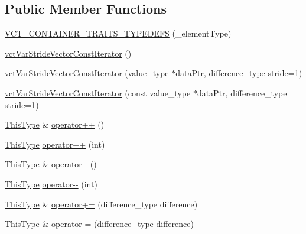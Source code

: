 \subsection*{Public Member Functions}
\begin{DoxyCompactItemize}
\item 
\hyperlink{classvct_var_stride_vector_const_iterator_a54d5bb180f198cc55568194d1ce4129c}{V\+C\+T\+\_\+\+C\+O\+N\+T\+A\+I\+N\+E\+R\+\_\+\+T\+R\+A\+I\+T\+S\+\_\+\+T\+Y\+P\+E\+D\+E\+F\+S} (\+\_\+element\+Type)
\item 
\hyperlink{classvct_var_stride_vector_const_iterator_af97b14def571ce0ee2b489d93a28e7b0}{vct\+Var\+Stride\+Vector\+Const\+Iterator} ()
\item 
\hyperlink{classvct_var_stride_vector_const_iterator_ae00e63fb9e2deae7fa6d949c4bec7652}{vct\+Var\+Stride\+Vector\+Const\+Iterator} (value\+\_\+type $\ast$data\+Ptr, difference\+\_\+type stride=1)
\item 
\hyperlink{classvct_var_stride_vector_const_iterator_a7f1e8affa1a308a17782d6609c95f02b}{vct\+Var\+Stride\+Vector\+Const\+Iterator} (const value\+\_\+type $\ast$data\+Ptr, difference\+\_\+type stride=1)
\item 
\hyperlink{classvct_var_stride_vector_const_iterator_afd99aad7dc756d227f4fb02cd569d00a}{This\+Type} \& \hyperlink{classvct_var_stride_vector_const_iterator_a8ebd4995ba7fe0b7f319a7a0f1cd52a0}{operator++} ()
\item 
\hyperlink{classvct_var_stride_vector_const_iterator_afd99aad7dc756d227f4fb02cd569d00a}{This\+Type} \hyperlink{classvct_var_stride_vector_const_iterator_a12591d59f1ef9294d4b52fdbca1de5fd}{operator++} (int)
\item 
\hyperlink{classvct_var_stride_vector_const_iterator_afd99aad7dc756d227f4fb02cd569d00a}{This\+Type} \& \hyperlink{classvct_var_stride_vector_const_iterator_a2fb864101547b86795e3468a2578d323}{operator-\/-\/} ()
\item 
\hyperlink{classvct_var_stride_vector_const_iterator_afd99aad7dc756d227f4fb02cd569d00a}{This\+Type} \hyperlink{classvct_var_stride_vector_const_iterator_a7d2d1fb4dda7dbff1aaa7b5e8f3ee4d1}{operator-\/-\/} (int)
\item 
\hyperlink{classvct_var_stride_vector_const_iterator_afd99aad7dc756d227f4fb02cd569d00a}{This\+Type} \& \hyperlink{classvct_var_stride_vector_const_iterator_a4343b9d61e4dfe8a9fc32dd47f00f83d}{operator+=} (difference\+\_\+type difference)
\item 
\hyperlink{classvct_var_stride_vector_const_iterator_afd99aad7dc756d227f4fb02cd569d00a}{This\+Type} \& \hyperlink{classvct_var_stride_vector_const_iterator_a0f344661bef0823c43074e75e744ef98}{operator-\/=} (difference\+\_\+type difference)

\end{DoxyCompactItemize}
